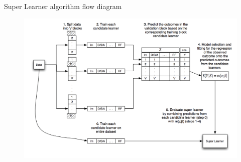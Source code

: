%
%


\begin{frame}{Super Learner algorithm flow diagram}

\begin{figure}
	\includegraphics[width=\textwidth]{./Figures/sup-learn.jpg}
\end{figure}

\end{frame}


